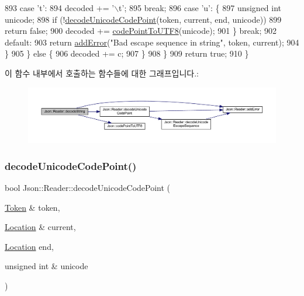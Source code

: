 \begin{DoxyCode}
893       \textcolor{keywordflow}{case} \textcolor{charliteral}{'t'}:
894         decoded += \textcolor{charliteral}{'\(\backslash\)t'};
895         \textcolor{keywordflow}{break};
896       \textcolor{keywordflow}{case} \textcolor{charliteral}{'u'}: \{
897         \textcolor{keywordtype}{unsigned} \textcolor{keywordtype}{int} unicode;
898         \textcolor{keywordflow}{if} (!\hyperlink{class_json_1_1_reader_a8fe24db3e9953aef3d637a56447e795c}{decodeUnicodeCodePoint}(token, current, end, unicode))
899           \textcolor{keywordflow}{return} \textcolor{keyword}{false};
900         decoded += \hyperlink{namespace_json_a33f8bda65a5b1fc4f5ddc39cb03dc742}{codePointToUTF8}(unicode);
901       \} \textcolor{keywordflow}{break};
902       \textcolor{keywordflow}{default}:
903         \textcolor{keywordflow}{return} \hyperlink{class_json_1_1_reader_af02176a1d2786b4415bbb00a1b10bb6b}{addError}(\textcolor{stringliteral}{"Bad escape sequence in string"}, token, current);
904       \}
905     \} \textcolor{keywordflow}{else} \{
906       decoded += c;
907     \}
908   \}
909   \textcolor{keywordflow}{return} \textcolor{keyword}{true};
910 \}
\end{DoxyCode}
이 함수 내부에서 호출하는 함수들에 대한 그래프입니다.\+:\nopagebreak
\begin{figure}[H]
\begin{center}
\leavevmode
\includegraphics[width=350pt]{class_json_1_1_reader_a8911a3225ee94d86d83edc2f8c1befe0_cgraph}
\end{center}
\end{figure}
\mbox{\label{class_json_1_1_reader_a8fe24db3e9953aef3d637a56447e795c}} 
\subsubsection{\texorpdfstring{decode\+Unicode\+Code\+Point()}{decodeUnicodeCodePoint()}}
{\footnotesize\ttfamily bool Json\+::\+Reader\+::decode\+Unicode\+Code\+Point (\begin{DoxyParamCaption}\item[{\hyperlink{class_json_1_1_reader_1_1_token}{Token} \&}]{token,  }\item[{\hyperlink{class_json_1_1_reader_a46795b5b272bf79a7730e406cb96375a}{Location} \&}]{current,  }\item[{\hyperlink{class_json_1_1_reader_a46795b5b272bf79a7730e406cb96375a}{Location}}]{end,  }\item[{unsigned int \&}]{unicode }\end{DoxyParamCaption})\hspace{0.3cm}{\ttfamily [private]}}



